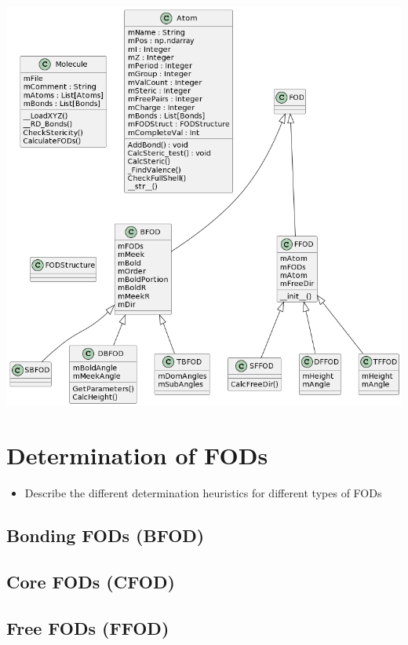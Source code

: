 \documentclass[12pt,a4paper,]{report}
\let\origfigure=\figure
\let\endorigfigure=\endfigure
\renewenvironment{figure}[1][]{%
\origfigure[H]
}{%
\endorigfigure
}
\providecommand{\tightlist}{%
  \setlength{\itemsep}{0pt}\setlength{\parskip}{0pt}}
\begin{document}
\begin{figure}
\hypertarget{fig:classdiag}{%
\centering
\includegraphics{source/figures/classes.png}
\caption{classes}\label{fig:classdiag}
}
\end{figure}

\section{Determination of FODs}\label{determination-of-fods}

\begin{itemize}
\tightlist
\item
  Describe the different determination heuristics for different types of
  FODs
\end{itemize}

\subsection{Bonding FODs (BFOD)}\label{bonding-fods-bfod}

\subsection{Core FODs (CFOD)}\label{core-fods-cfod}

\subsection{Free FODs (FFOD)}\label{free-fods-ffod}
\end{document}
